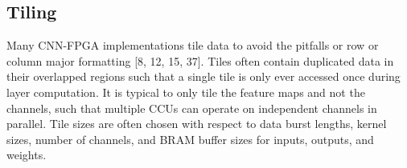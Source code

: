 \subsection{Tiling}
Many CNN-FPGA implementations tile data to avoid the pitfalls or row or column major formatting [8, 12, 15, 37]. Tiles often contain duplicated data in their overlapped regions such that a single tile is only ever accessed once during layer computation. It is typical to only tile the feature maps and not the channels, such that multiple CCUs can operate on independent channels in parallel. Tile sizes are often chosen with respect to data burst lengths, kernel sizes, number of channels, and BRAM buffer sizes for inputs, outputs, and weights.